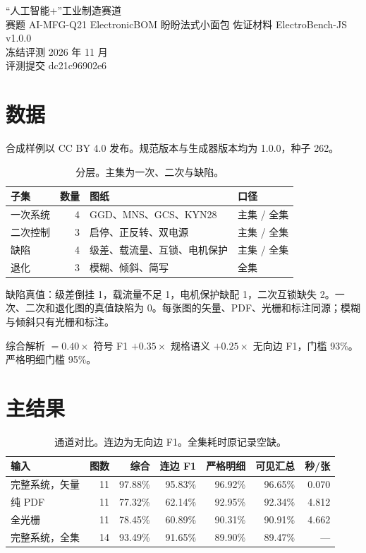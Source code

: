 

\contesttitlepage
  {“人工智能+”工业制造赛道\\赛题 AI-MFG-Q21}
  {ElectronicBOM}
  {盼盼法式小面包}
  {佐证材料}
  {ElectroBench-JS v1.0.0\\冻结评测}
  {2026 年 11 月\\评测提交 dc21c96902e6}

\begin{abstract}
主集 11 张：综合解析 97.88\%，严格明细 96.92\%，四类红灯 5 次真阳性、0 误报、0 漏报。全集 14 张综合解析 93.49\%。符号实例 345，类别 40/40。
\end{abstract}

\section{数据}
合成样例以 CC BY 4.0 发布。规范版本与生成器版本均为 1.0.0，种子 262。

\begin{table}[ht]
\centering
\caption{分层。主集为一次、二次与缺陷。}
\small
\begin{tabularx}{\textwidth}{lrlX}
\toprule
子集 & 数量 & 图纸 & 口径 \\
\midrule
一次系统 & 4 & GGD、MNS、GCS、KYN28 & 主集 / 全集 \\
二次控制 & 3 & 启停、正反转、双电源 & 主集 / 全集 \\
缺陷 & 4 & 级差、载流量、互锁、电机保护 & 主集 / 全集 \\
退化 & 3 & 模糊、倾斜、简写 & 全集 \\
\bottomrule
\end{tabularx}
\end{table}

缺陷真值：级差倒挂 1，载流量不足 1，电机保护缺配 1，二次互锁缺失 2。一次、二次和退化图的真值缺陷为 0。每张图的矢量、PDF、光栅和标注同源；模糊与倾斜只有光栅和标注。

综合解析 $=0.40\times$ 符号 F1 $+0.35\times$ 规格语义 $+0.25\times$ 无向边 F1，门槛 93\%。严格明细门槛 95\%。

\section{主结果}
\begin{table}[ht]
\centering
\caption{通道对比。连边为无向边 F1。全集耗时原记录空缺。}
\label{tab:ch}
\footnotesize
\setlength{\tabcolsep}{4pt}
\begin{tabular}{lrrrrrr}
\toprule
输入 & 图数 & 综合 & 连边 F1 & 严格明细 & 可见汇总 & 秒/张 \\
\midrule
完整系统，矢量 & 11 & 97.88\% & 95.83\% & 96.92\% & 96.65\% & 0.070 \\
纯 PDF & 11 & 77.32\% & 62.14\% & 92.95\% & 92.34\% & 4.812 \\
全光栅 & 11 & 78.45\% & 60.89\% & 90.31\% & 90.91\% & 4.662 \\
完整系统，全集 & 14 & 93.49\% & 91.65\% & 89.90\% & 89.47\% & --- \\
\bottomrule
\end{tabular}
\end{table}

